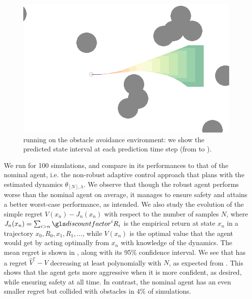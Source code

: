 \begin{figure}[ht]
	\centering
	\includegraphics[width=0.7\linewidth]{img/obstacle_small}
	\caption{ running on the obstacle avoidance environment: we show the predicted state interval at each prediction time step (from  to ).}
	\label{fig:obstacle-env}
\end{figure}

We run  for 100 simulations, and compare in  its performances to that of the nominal agent, i.e. the non-robust adaptive control approach that plans with the estimated dynamics $\theta_{[N],\lambda}$. We observe that though the robust agent performs worse than the nominal agent on average, it manages to ensure safety and attains a better worst-case performance, as intended. We also study the evolution of the simple regret $V(x_n) - J_n(x_n)$ with respect to the number of samples $N$, where $J_n(x_n) = \sum_{i > n} \discount^i R_i$ is the empirical return at state $x_n$ in a trajectory $x_0, R_0, x_1, R_1, \dots$, while $V(x_n)$ is the optimal value that the agent would get by acting optimally from $x_n$ with knowledge of the dynamics. The mean regret is shown in , along with its 95\% confidence interval. We see that  has a regret $\hat{V}^r - V$ decreasing at least polynomially with $N$, as expected from . This shows that the agent gets more aggressive when it is more confident, as desired, while ensuring safety at all time. In contrast, the nominal agent has an even smaller regret but collided with obstacles in $4\%$ of simulations.


